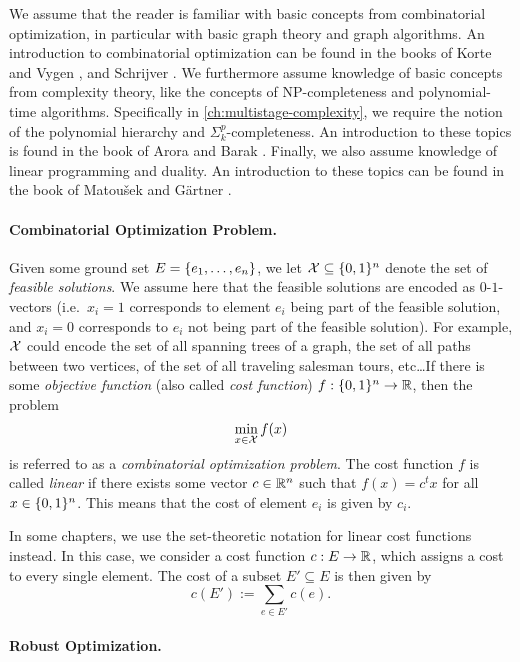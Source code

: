 We assume that the reader is familiar with basic concepts from combinatorial optimization, in particular with basic graph theory and graph algorithms. An introduction to combinatorial optimization can be found in the books of Korte and Vygen \cite{korte2006combinatorial}, and Schrijver \cite{schrijver2003combinatorial}. We furthermore assume knowledge of basic concepts from complexity theory, like the concepts of NP-completeness and polynomial-time algorithms. Specifically in \cref{ch:multistage-complexity}, we require the notion of the polynomial hierarchy and $\Sigma^p_k$-completeness. An introduction to these topics is found in the book of Arora and Barak \cite{arora2009computational}. Finally, we also assume knowledge of linear programming and duality. An introduction to these topics can be found in the book of Matou{\v{s}}ek and Gärtner \cite{matouvsek2007understanding}.

\paragraph*{Combinatorial Optimization Problem.}
Given some ground set $E = \{ e_1, \ldots, e_n \}$, we let $\mathcal{X} \subseteq \{ 0,1 \}^n$ denote the set of \emph{feasible solutions}. 
We assume here that the feasible solutions are encoded as $0$-$1$-vectors (i.e.\ $x_i = 1$ corresponds to element $e_i$ being part of the feasible solution, and $x_i=0$ corresponds to $e_i$ not being part of the feasible solution). 
For example, $\mathcal{X}$ could encode the set of all spanning trees of a graph, the set of all paths between two vertices, of the set of all traveling salesman tours, etc\dots If there is some \emph{objective function} (also called \emph{cost function}) $f : \{ 0,1 \}^n \to \mathbb{R}$, then the problem
\[
\min_{x \in \mathcal{X}} f(x)
\]
is referred to as a \emph{combinatorial optimization problem}. The cost function $f$ is called \emph{linear} if there exists some vector $c \in \mathbb{R}^n$ such that $f(x) = c^tx$ for all $x \in \{ 0,1 \}^n$. This means that the cost of element $e_i$ is given by $c_i$.

In some chapters, we use the set-theoretic notation for linear cost functions instead. In this case, we consider a cost function $c : E \to \mathbb{R}$, which assigns a cost to every single element. The cost of a subset $E' \subseteq E$ is then given by
\[ c(E') := \sum_{e \in E'}c(e). \]



\paragraph*{Robust Optimization.}

